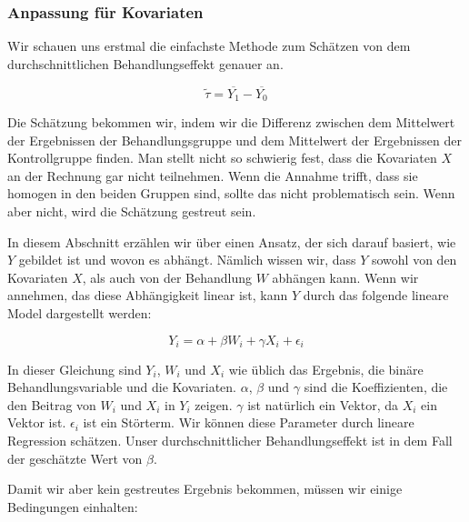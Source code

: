 \documentclass[12pt,a4paper,twoside]{scrartcl}
\numberwithin{equation}{section}
\begin{document}
\subsubsection{Anpassung für Kovariaten}\label{subsubsec:anpassungKovariaten}
Wir schauen uns erstmal die einfachste Methode zum Schätzen von dem durchschnittlichen Behandlungseffekt genauer an.\par

\begin{equation}\label{eq:2.1}
  \widetilde{\tau} = \overline{Y_1}-\overline{Y_0}
\end{equation}

\noindent
Die Schätzung bekommen wir, indem wir die Differenz zwischen dem Mittelwert der Ergebnissen der Behandlungsgruppe und dem Mittelwert der Ergebnissen der Kontrollgruppe finden. Man stellt nicht so schwierig fest, dass die Kovariaten $X$ an der Rechnung gar nicht teilnehmen. Wenn die Annahme trifft, dass sie homogen in den beiden Gruppen sind, sollte das nicht problematisch sein. Wenn aber nicht, wird die Schätzung gestreut sein.\par

\noindent
In diesem Abschnitt erzählen wir über einen Ansatz, der sich darauf basiert, wie $Y$ gebildet ist und wovon es abhängt. Nämlich wissen wir, dass $Y$ sowohl von den Kovariaten $X$, als auch von der Behandlung $W$ abhängen kann. Wenn wir annehmen, das diese Abhängigkeit linear ist, kann $Y$ durch das folgende lineare Model dargestellt werden:\par 

\begin{equation}\label{eq:2.2}
  Y_i = \alpha + \beta W_i + \gamma X_i + \epsilon_i
\end{equation}

\noindent
In dieser Gleichung sind $Y_i$, $W_i$ und $X_i$ wie üblich das Ergebnis, die binäre Behandlungsvariable und die Kovariaten. $\alpha$, $\beta$ und $\gamma$ sind die Koeffizienten, die den Beitrag von $W_i$ und $X_i$ in $Y_i$ zeigen. $\gamma$ ist natürlich ein Vektor, da $X_i$ ein Vektor ist. $\epsilon_i$ ist ein Störterm. Wir können diese Parameter durch lineare Regression schätzen. Unser durchschnittlicher Behandlungseffekt ist in dem Fall der geschätzte Wert von $\beta$\cite{cox1982biometrics}.\par

\noindent
Damit wir aber kein gestreutes Ergebnis bekommen, müssen wir einige Bedingungen einhalten:\par
\end{document}
